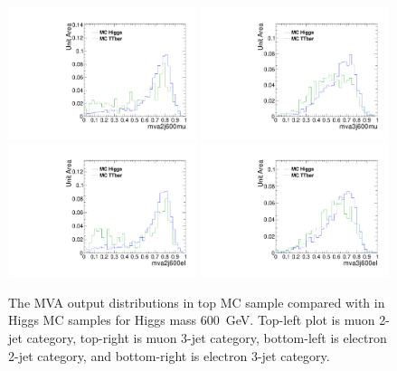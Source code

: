 \begin{figure}[!t]
  \centering
  \includegraphics[width=0.49\textwidth]{figs/cl-mva2j600mu-mvaTopvsHiggs.pdf}
  \includegraphics[width=0.49\textwidth]{figs/cl-mva3j600mu-mvaTopvsHiggs.pdf}
  \includegraphics[width=0.49\textwidth]{figs/cl-mva2j600el-mvaTopvsHiggs.pdf}
  \includegraphics[width=0.49\textwidth]{figs/cl-mva3j600el-mvaTopvsHiggs.pdf}
  \caption{\label{fig:mva:sigvsttbar-mva2j600}The MVA output
    distributions in top MC sample compared with in Higgs MC
    samples for Higgs mass 600~GeV. Top-left plot is muon 2-jet category,
    top-right is muon 3-jet category, bottom-left is electron 2-jet
    category, and bottom-right is electron 3-jet category. }
\end{figure}
